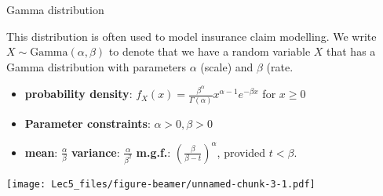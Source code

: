 \documentclass[ignorenonframetext,]{beamer}
\begin{document}
\begin{frame}{Gamma distribution}

This distribution is often used to model insurance claim modelling. We
write \(X\sim\text{Gamma}(\alpha,\beta)\) to denote that we have a
random variable \(X\) that has a Gamma distribution with parameters
\(\alpha\) (scale) and \(\beta\) (rate.

\begin{itemize}
\item
  \textbf{probability density}:
  \(f_X(x)=\frac{\beta^{\alpha}}{\Gamma(\alpha)}x^{\alpha-1}e^{-\beta x}\)
  for \(x\ge 0\)
\item
  \textbf{Parameter constraints}: \(\alpha>0,\beta>0\)
\item
  \textbf{mean}: \(\frac{\alpha}{\beta}\) \textbf{variance}:
  \(\frac{\alpha}{\beta^2}\) \textbf{m.g.f.}:
  \(\left(\frac{\beta}{\beta-t}\right)^{\alpha}\), provided \(t<\beta\).
\end{itemize}

\texttt{[image: Lec5\_files/figure-beamer/unnamed-chunk-3-1.pdf]}

\end{frame}
\end{document}
